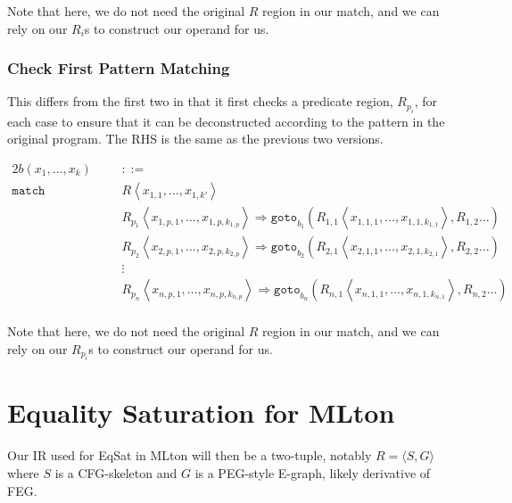 \documentclass{article}
\begin{document}
Note that here, we do not need the original $R$ region in our match, and we can rely on our $R_{i}$s to construct our operand for us.

\subsubsection{Check First Pattern Matching}

This differs from the first two in that it first checks a predicate region, $R_{p_i}$, for each case to ensure that it can be deconstructed according to the pattern in the original program. The RHS is the same as the previous two versions.

\begin{alignat*}{2}
b(x_1, \dots, x_k) &&&::=  \\
\texttt{match} \, &&& R \left\langle x_{1,1}, \dots, x_{1,k'} \right\rangle \\
    & && R_{p_1} \left\langle x_{1,p,1}, \dots, x_{1,p,k_{1,p}} \right\rangle \Rightarrow \texttt{goto}_{b_1} \left( R_{1,1} \left\langle x_{1,1,1}, \dots, x_{1,1,k_{1,1}} \right\rangle, R_{1,2} \dots\right) \\
    & && R_{p_2} \left\langle x_{2,p,1}, \dots, x_{2,p,k_{2,p}} \right\rangle \Rightarrow \texttt{goto}_{b_2} \left( R_{2,1} \left\langle x_{2,1,1}, \dots, x_{2,1,k_{2,1}} \right\rangle, R_{2,2} \dots\right) \\
    & &&\vdots \\
    & && R_{p_n} \left\langle x_{n,p,1}, \dots, x_{n,p,k_{n,p}} \right\rangle \Rightarrow \texttt{goto}_{b_n} \left( R_{n,1} \left\langle x_{n,1,1}, \dots, x_{n,1,k_{n,1}} \right\rangle, R_{n,2} \dots\right) \\
\end{alignat*}

Note that here, we do not need the original $R$ region in our match, and we can rely on our $R_{p_i}$s to construct our operand for us.


\section{Equality Saturation for MLton}

Our IR used for EqSat in MLton will then be a two-tuple, notably $R=\langle S, G \rangle$ where $S$ is a CFG-skeleton and $G$ is a PEG-style E-graph, likely derivative of FEG.



\end{document}
